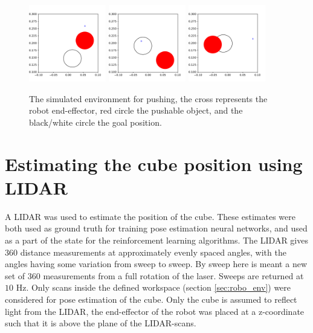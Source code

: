 \begin{figure}[!ht]
    \centering
    \includegraphics[width=0.3\textwidth]{res/env_sim1.pdf}
    \includegraphics[width=0.3\textwidth]{res/env_sim2.pdf}
    \includegraphics[width=0.3\textwidth]{res/env_sim3.pdf}

    \caption{The simulated environment for pushing, the cross represents the
    robot end-effector, red circle the pushable object, and the black/white
    circle the goal position.}

    \label{fig:env_sim_samples}
\end{figure}

\section{Estimating the cube position using LIDAR}
\label{sec:method_hough}

A LIDAR was used to estimate the position of the cube. These estimates were
both used as ground truth for training pose estimation neural networks, and
used as a part of the state for the reinforcement learning algorithms. The
LIDAR gives $360$ distance measurements at approximately evenly spaced angles,
with the angles having some variation from sweep to sweep. By sweep here is
meant a new set of 360 measurements from a full rotation of the laser. Sweeps
are returned at $10$ Hz. Only scans inside the defined workspace (section
\ref{sec:robo_env}) were considered for pose estimation of the cube. Only the
cube is assumed to reflect light from the LIDAR, the end-effector of the robot
was placed at a z-coordinate such that it is above the plane of the
LIDAR-scans.

